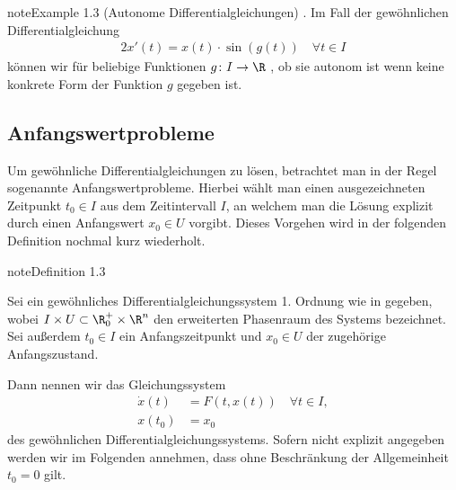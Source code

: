 \documentclass[letterpaper,10pt,german]{jupyterBook}
\begin{document}
\begin{sphinxadmonition}{note}{Example 1.3 (Autonome Differentialgleichungen)}
. Im Fall der gewöhnlichen Differentialgleichung
\begin{equation*}
\begin{split}2x'(t) = x(t)\cdot \sin(g(t)) \quad \forall t \in I\end{split}
\end{equation*}
\sphinxAtStartPar
können wir für beliebige Funktionen \(g \colon I \rightarrow \R\) , ob sie autonom ist wenn keine konkrete Form der Funktion \(g\) gegeben ist.
\end{sphinxadmonition}


\subsection{Anfangswertprobleme}
\label{\detokenize{ode/repetition:anfangswertprobleme}}
\sphinxAtStartPar
Um gewöhnliche Differentialgleichungen zu lösen, betrachtet man in der Regel sogenannte Anfangswertprobleme.
Hierbei wählt man einen ausgezeichneten Zeitpunkt \(t_0\in I\) aus dem Zeitintervall \(I\), an welchem man die Lösung explizit durch einen Anfangswert \(x_0\in U\) vorgibt.
Dieses Vorgehen wird in der folgenden Definition nochmal kurz wiederholt.
\label{ode/repetition:def:anfangswertproblem}
\begin{sphinxadmonition}{note}{Definition 1.3}



\sphinxAtStartPar
Sei ein gewöhnliches Differentialgleichungssystem 1. Ordnung wie in {\hyperref[\detokenize{ode/repetition:def:DGL}]{}} gegeben, wobei \(I \times U \subset \R_0^+ \times \R^n\) den erweiterten Phasenraum des Systems bezeichnet.
Sei außerdem \(t_0 \in I\) ein Anfangszeitpunkt und \(x_0 \in U\) der zugehörige Anfangszustand.

\sphinxAtStartPar
Dann nennen wir das Gleichungssystem
\begin{equation}\label{equation:ode/repetition:eq:AWP}
\begin{split}\dot{x}(t) &= F(t, x(t))\quad\forall t\in I, \\
x(t_0) &= x_0\end{split}
\end{equation}
\sphinxAtStartPar
{} des gewöhnlichen Differentialgleichungssystems.
Sofern nicht explizit angegeben werden wir im Folgenden annehmen, dass ohne Beschränkung der Allgemeinheit \(t_0=0\) gilt.
\end{sphinxadmonition}
\end{document}
